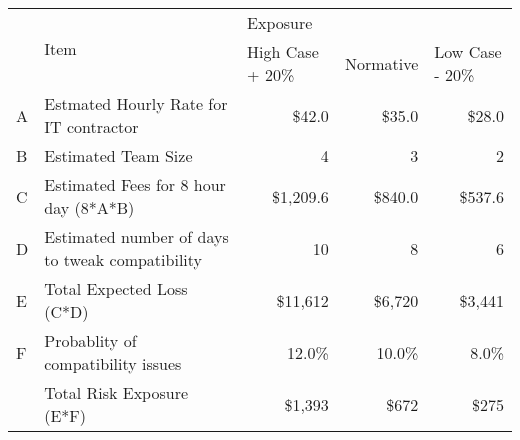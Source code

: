 \begin{table}[h]
\begin{tabular}{@{}llrrr@{}}
\toprule
\multirow{2}{*}{} & \multirow{2}{*}{Item}                           & \multicolumn{3}{l}{Exposure}                                                                               \\ \cmidrule(l){3-5} 
                  &                                                 & \multicolumn{1}{l}{High Case + 20\%} & \multicolumn{1}{l}{Normative} & \multicolumn{1}{l}{Low Case - 20\%} \\ \cmidrule(r){1-2}
A                 & Estmated Hourly Rate for IT contractor          & \$42.0                               & \$35.0                        & \$28.0                              \\
B                 & Estimated Team Size                             & 4                                    & 3                             & 2                                   \\
C                 & Estimated Fees for 8 hour day (8*A*B)           & \$1,209.6                            & \$840.0                       & \$537.6                             \\
D                 & Estimated number of days to tweak compatibility & 10                                   & 8                             & 6                                   \\
E                 & Total Expected Loss (C*D)                       & \$11,612                             & \$6,720                       & \$3,441                             \\
F                 & Probablity of compatibility issues              & 12.0\%                               & 10.0\%                        & 8.0\%                               \\
                  & Total Risk Exposure (E*F)                       & \$1,393                              & \$672                         & \$275                              
\end{tabular}
\end{table}